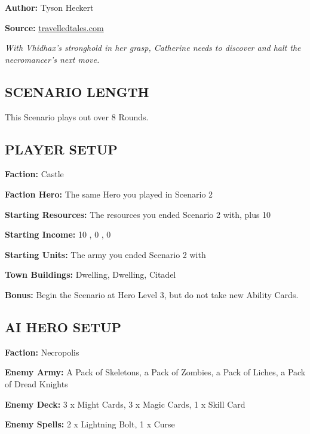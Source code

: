 
\begin{multicols*}{2}

\textbf{Author:} Tyson Heckert

\textbf{Source:} \href{https://travelledtales.com}{travelledtales.com}

\textit{With Vhidhax's stronghold in her grasp, Catherine needs to discover and halt the necromancer's next move.}

\subsection*{\MakeUppercase{Scenario length}}

This Scenario plays out over 8 Rounds.

\subsection*{\MakeUppercase{Player setup}}

\textbf{Faction:} Castle

\textbf{Faction Hero:} The same Hero you played in Scenario 2

\textbf{Starting Resources:} The resources you ended Scenario 2 with, plus 10 

\textbf{Starting Income:} 10 , 0 , 0 

\textbf{Starting Units:} The army you ended Scenario 2 with

\textbf{Town Buildings:}  Dwelling,  Dwelling, Citadel

\textbf{Bonus:} Begin the Scenario at Hero Level 3, but do not take new Ability Cards.

\subsection*{\MakeUppercase{AI Hero setup}}

\textbf{Faction:} Necropolis

\textbf{Enemy Army:} A Pack of Skeletons, a Pack of Zombies, a Pack of Liches, a Pack of Dread Knights

\textbf{Enemy Deck:} 3 x Might Cards, 3 x Magic Cards, 1 x Skill Card

\textbf{Enemy Spells:} 2 x Lightning Bolt, 1 x Curse


\end{multicols*}
